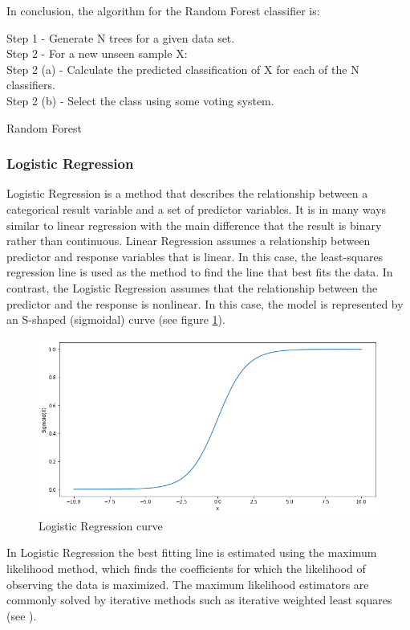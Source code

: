 In conclusion, the algorithm for the Random Forest classifier is:

\begin{algorithm}[H]
Step 1 - Generate N trees for a given data set. \\
Step 2 - For a new unseen sample X: \\
Step 2 (a) - Calculate the predicted classification of X for each of the N classifiers. \\
Step 2 (b) - Select the class using some voting system.
\caption{Random Forest}
\end{algorithm}

\subsubsection{Logistic Regression}

Logistic Regression is a method that describes the relationship between a categorical result variable and a set of predictor variables. It is in many ways similar to linear regression with the main difference that the result is binary rather than continuous. Linear Regression assumes a relationship between predictor and response variables that is linear. In this case, the least-squares regression line is used as the method to find the line that best fits the data. In contrast, the Logistic Regression assumes that the relationship between the predictor and the response is nonlinear. In this case, the model is represented by an S-shaped (sigmoidal) curve (see figure \ref{fig:sig}).

\begin{figure}[htb]
	\centering
  	\includegraphics[scale=.5]{Imagens/sigmoid.png}
  	\caption{Logistic Regression curve}
  	\label{fig:sig}
\end{figure}

In Logistic Regression the best fitting line is estimated using the maximum likelihood method, which finds the coefficients for which the likelihood of observing the data is maximized. The maximum likelihood estimators are commonly solved by iterative methods such as iterative weighted least squares (see \cite{nelder1972generalized}).

